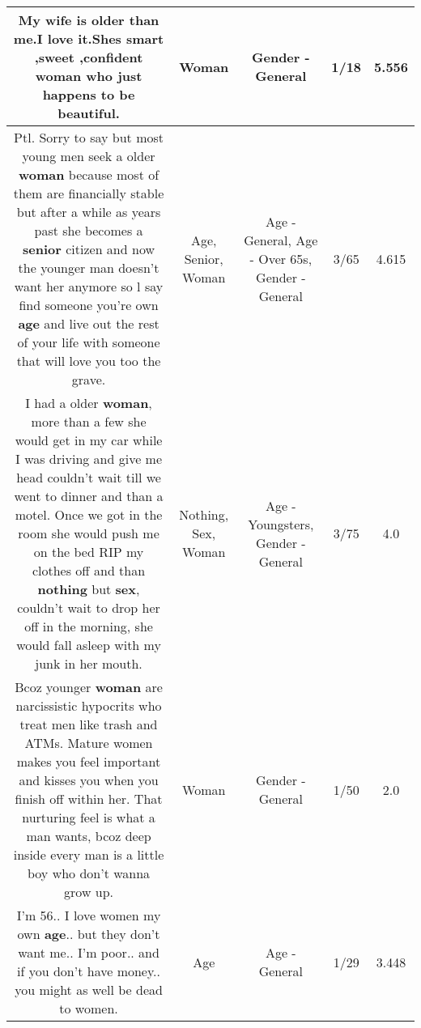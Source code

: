 \documentclass[11pt]{article}
\newlength\mylength
\begin{document}
\begin{center}
\begin{longtable}{|C{.65\mylength}|C{.30\mylength}|C{.12\mylength}|C{.12\mylength}|C{.12\mylength}|}
  \small My wife is older than me.I love it.Shes smart ,sweet ,confident \textbf{woman} who  just happens to  be  beautiful.\normalsize   & Woman & Gender - General & 1/18 & 5.556 \\  \hline
  \small Ptl. Sorry to say but most young men seek a older \textbf{woman} because most of them are financially stable but after a while as years past she becomes a \textbf{senior} citizen and now the younger man doesn't want her anymore so l say find someone you're own \textbf{age} and live out the rest of your life with someone that will love you too the grave.\normalsize   & Age, Senior, Woman & Age - General, Age - Over 65s, Gender - General & 3/65 & 4.615 \\  \hline
  \small I had a older \textbf{woman}, more than a few she would get in my car while I was driving and give me head couldn't wait till we went to dinner and than a motel. Once we got in the room she would push me on the bed RIP my clothes off and than \textbf{nothing} but \textbf{sex}, couldn't wait to drop her off in the morning, she would fall asleep with my junk in her mouth.\normalsize   & Nothing, Sex, Woman & Age - Youngsters, Gender - General & 3/75 & 4.0 \\  \hline
  \small Bcoz younger \textbf{woman} are narcissistic hypocrits who treat men like trash and ATMs. Mature women makes you feel important and kisses you when you finish off within her. That nurturing feel is what a man wants, bcoz deep inside every man is a little boy who don't wanna grow up.\normalsize   & Woman & Gender - General & 1/50 & 2.0 \\  \hline
  \small I'm 56.. I love women my own \textbf{age}.. but they don't want me.. I'm poor.. and if you don't have money.. you might as well be dead to women.\normalsize   & Age & Age - General & 1/29 & 3.448 \\  \hline

\end{longtable}
\end{center}
\end{document}
